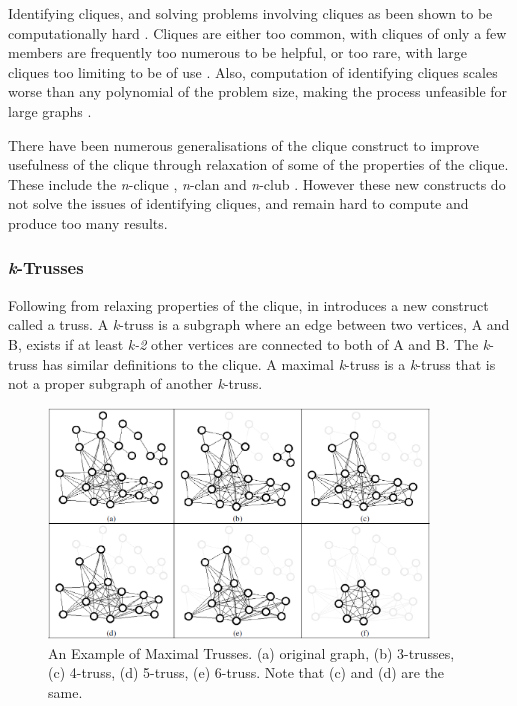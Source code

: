Identifying cliques, and solving problems involving cliques as been shown to be computationally hard \cite{bomze99, trusses}. Cliques are either too common, with cliques of only a few members are frequently too numerous to be helpful, or too rare, with large cliques too limiting to be of use \cite{trusses}. Also, computation of identifying cliques scales worse than any polynomial of the problem size, making the process unfeasible for large graphs \cite{trusses, bron72}.

There have been numerous generalisations of the clique construct to improve usefulness of the clique through relaxation of some of the properties of the clique. These include the \emph{n}-clique \cite{luce50}, \emph{n}-clan \cite{alba73} and \emph{n}-club \cite{mokken79}. However these new constructs do not solve the issues of identifying cliques, and remain hard to compute and produce too many results.

\subsubsection{\emph{k}-Trusses}
Following from relaxing properties of the clique, \citeauthor{trusses} in \cite{trusses} introduces a new construct called a truss. A \emph{k}-truss is a subgraph where an edge between two vertices, A and B, exists if at least \emph{k-2} other vertices are connected to both of A and B. The \emph{k}-truss has similar definitions to the clique. A maximal \emph{k}-truss is a \emph{k}-truss that is not a proper subgraph of another \emph{k}-truss.

\begin{figure}[htbp]
\centering
\includegraphics[width=0.9\textwidth]{./img/trusses.png}
\caption{An Example of Maximal Trusses. (a) original graph, (b) 3-trusses, (c) 4-truss, (d) 5-truss, (e) 6-truss. Note that (c) and (d) are the same. \cite{trusses}}
\label{fig:trusses}
\end{figure}

